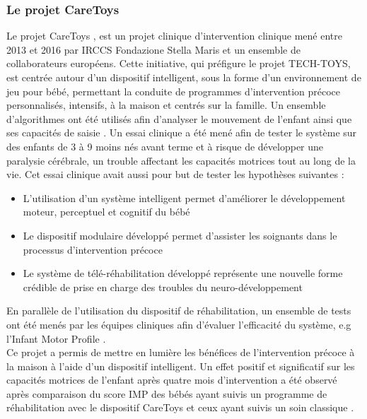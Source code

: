 \documentclass[8pt]{article}
\begin{document}
\subsubsection{Le projet CareToys}
\par Le projet CareToys \cite{noauthor_project_nodate}, \cite{cecchi_caretoy_2016} est un projet clinique d’intervention clinique mené entre 2013 et 2016 par IRCCS Fondazione Stella Maris et un ensemble de collaborateurs européens. Cette initiative, qui préfigure le projet TECH-TOYS, est centrée autour d’un dispositif intelligent, sous la forme d’un environnement de jeu pour bébé, permettant la conduite de programmes d’intervention précoce personnalisés, intensifs, à la maison et centrés sur la famille. Un ensemble d’algorithmes ont été utilisés afin d’analyser le mouvement de l’enfant \cite{rihar_infant_2014} ainsi que ses capacités de saisie \cite{del_maestro_sensing_2011}. Un essai clinique \cite{sgandurra_home-based_2014} a été mené afin de tester le système sur des enfants de 3 à 9 moins nés avant terme et à risque de développer une paralysie cérébrale, un trouble affectant les capacités motrices tout au long de la vie. Cet essai clinique avait aussi pour but de tester les hypothèses suivantes : \begin{itemize}
    \item L’utilisation d’un système intelligent permet d’améliorer le développement moteur, perceptuel et cognitif du bébé
    \item Le dispositif modulaire développé permet d’assister les soignants dans le processus d’intervention précoce
    \item Le système de télé-réhabilitation développé représente une nouvelle forme crédible de prise en charge des troubles du neuro-développement
\end{itemize} 
En parallèle de l’utilisation du dispositif de réhabilitation, un ensemble de tests ont été menés par les équipes cliniques afin d’évaluer l’efficacité du système, e.g l’Infant Motor Profile \cite{heineman_infant_2008}.\\
Ce projet a permis de mettre en lumière les bénéfices de l’intervention précoce à la maison à l’aide d’un dispositif intelligent. Un effet positif et significatif sur les capacités motrices de l’enfant après quatre mois d’intervention a été observé après comparaison du score IMP des bébés ayant suivis un programme de réhabilitation avec le dispositif CareToys et ceux ayant suivis un soin classique \cite{sgandurra_effects_2019}.
\end{document}
